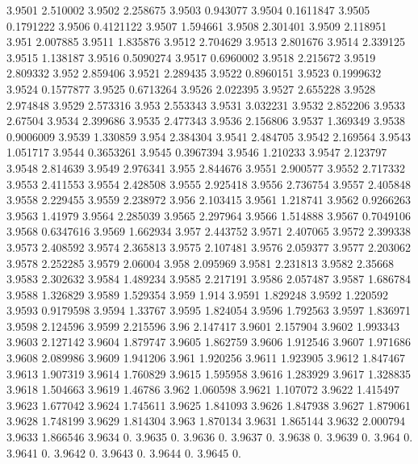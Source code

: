 3.9501  2.510002
3.9502  2.258675
3.9503  0.943077
3.9504  0.1611847
3.9505  0.1791222
3.9506  0.4121122
3.9507  1.594661
3.9508  2.301401
3.9509  2.118951
3.951  2.007885
3.9511  1.835876
3.9512  2.704629
3.9513  2.801676
3.9514  2.339125
3.9515  1.138187
3.9516  0.5090274
3.9517  0.6960002
3.9518  2.215672
3.9519  2.809332
3.952  2.859406
3.9521  2.289435
3.9522  0.8960151
3.9523  0.1999632
3.9524  0.1577877
3.9525  0.6713264
3.9526  2.022395
3.9527  2.655228
3.9528  2.974848
3.9529  2.573316
3.953  2.553343
3.9531  3.032231
3.9532  2.852206
3.9533  2.67504
3.9534  2.399686
3.9535  2.477343
3.9536  2.156806
3.9537  1.369349
3.9538  0.9006009
3.9539  1.330859
3.954  2.384304
3.9541  2.484705
3.9542  2.169564
3.9543  1.051717
3.9544  0.3653261
3.9545  0.3967394
3.9546  1.210233
3.9547  2.123797
3.9548  2.814639
3.9549  2.976341
3.955  2.844676
3.9551  2.900577
3.9552  2.717332
3.9553  2.411553
3.9554  2.428508
3.9555  2.925418
3.9556  2.736754
3.9557  2.405848
3.9558  2.229455
3.9559  2.238972
3.956  2.103415
3.9561  1.218741
3.9562  0.9266263
3.9563  1.41979
3.9564  2.285039
3.9565  2.297964
3.9566  1.514888
3.9567  0.7049106
3.9568  0.6347616
3.9569  1.662934
3.957  2.443752
3.9571  2.407065
3.9572  2.399338
3.9573  2.408592
3.9574  2.365813
3.9575  2.107481
3.9576  2.059377
3.9577  2.203062
3.9578  2.252285
3.9579  2.06004
3.958  2.095969
3.9581  2.231813
3.9582  2.35668
3.9583  2.302632
3.9584  1.489234
3.9585  2.217191
3.9586  2.057487
3.9587  1.686784
3.9588  1.326829
3.9589  1.529354
3.959  1.914
3.9591  1.829248
3.9592  1.220592
3.9593  0.9179598
3.9594  1.33767
3.9595  1.824054
3.9596  1.792563
3.9597  1.836971
3.9598  2.124596
3.9599  2.215596
3.96  2.147417
3.9601  2.157904
3.9602  1.993343
3.9603  2.127142
3.9604  1.879747
3.9605  1.862759
3.9606  1.912546
3.9607  1.971686
3.9608  2.089986
3.9609  1.941206
3.961  1.920256
3.9611  1.923905
3.9612  1.847467
3.9613  1.907319
3.9614  1.760829
3.9615  1.595958
3.9616  1.283929
3.9617  1.328835
3.9618  1.504663
3.9619  1.46786
3.962  1.060598
3.9621  1.107072
3.9622  1.415497
3.9623  1.677042
3.9624  1.745611
3.9625  1.841093
3.9626  1.847938
3.9627  1.879061
3.9628  1.748199
3.9629  1.814304
3.963  1.870134
3.9631  1.865144
3.9632  2.000794
3.9633  1.866546
3.9634  0.
3.9635  0.
3.9636  0.
3.9637  0.
3.9638  0.
3.9639  0.
3.964  0.
3.9641  0.
3.9642  0.
3.9643  0.
3.9644  0.
3.9645  0.
